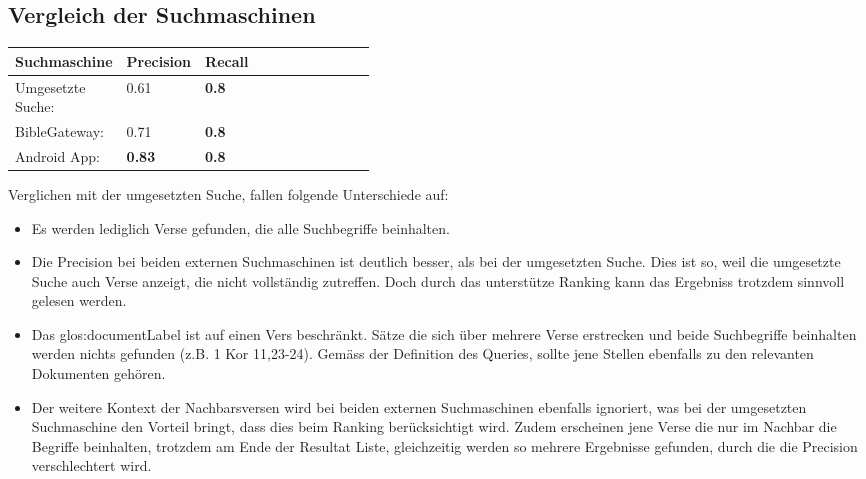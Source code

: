 \subsection{Vergleich der Suchmaschinen}
\begin{table}[H]
	\centering
	\small\renewcommand{\arraystretch}{1.4}
	\begin{tabularx}{0.9\textwidth}{ L{0.22\linewidth} | L{0.2\linewidth} | X }%
		\hline
		\textbf{Suchmaschine} & \textbf{Precision} & \textbf{Recall} \\ \hline \hline
		Umgesetzte Suche: & 0.61 & \textbf{0.8}\\
		BibleGateway: & 0.71  & \textbf{0.8}\\
		Android App: & \textbf{0.83} & \textbf{0.8}\\
		\hline
	\end{tabularx}
\end{table}

Verglichen mit der umgesetzten Suche, fallen folgende Unterschiede auf:
\begin{itemize}[noitemsep]
	\item Es werden lediglich Verse gefunden, die alle Suchbegriffe beinhalten.
	\item Die Precision bei beiden externen Suchmaschinen ist deutlich besser, als bei der umgesetzten Suche.
	Dies ist so, weil die umgesetzte Suche auch Verse anzeigt, die nicht vollständig zutreffen. Doch durch das unterstütze Ranking kann das Ergebniss trotzdem sinnvoll gelesen werden.
	\item Das \gls{glos:documentLabel} ist auf einen Vers beschränkt. Sätze die sich über mehrere Verse erstrecken und beide Suchbegriffe beinhalten werden nichts gefunden (z.B. 1 Kor 11,23-24).
	Gemäss der Definition des Queries, sollte jene Stellen ebenfalls zu den relevanten Dokumenten gehören.
	\item Der weitere Kontext der Nachbarsversen wird bei beiden externen Suchmaschinen ebenfalls ignoriert, was bei der umgesetzten Suchmaschine den Vorteil bringt, dass dies beim Ranking berücksichtigt wird.
	Zudem erscheinen jene Verse die nur im Nachbar die Begriffe beinhalten, trotzdem am Ende der Resultat Liste, gleichzeitig werden so mehrere Ergebnisse gefunden, durch die die Precision verschlechtert wird.
\end{itemize}



